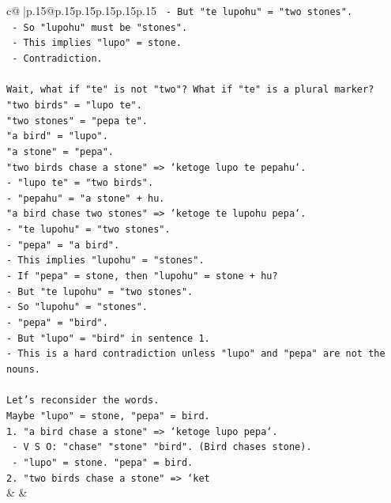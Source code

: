 \documentclass{article}
\begin{document}
{\begin{supertabular}{c@{$\;$}|p{.15\linewidth}@{}p{.15\linewidth}p{.15\linewidth}p{.15\linewidth}p{.15\linewidth}p{.15\linewidth}}
{{{\texttt{   {-} But "te lupohu" = "two stones".} \\
\texttt{   {-} So "lupohu" must be "stones".} \\
\texttt{   {-} This implies "lupo" = stone.} \\
\texttt{   {-} Contradiction.} \\
\\ 
\texttt{Wait, what if "te" is not "two"? What if "te" is a plural marker?} \\
\texttt{"two birds" = "lupo te".} \\
\texttt{"two stones" = "pepa te".} \\
\texttt{"a bird" = "lupo".} \\
\texttt{"a stone" = "pepa".} \\
\texttt{"two birds chase a stone" => `ketoge lupo te pepahu`.} \\
\texttt{{-} "lupo te" = "two birds".} \\
\texttt{{-} "pepahu" = "a stone" + hu.} \\
\texttt{"a bird chase two stones" => `ketoge te lupohu pepa`.} \\
\texttt{{-} "te lupohu" = "two stones".} \\
\texttt{{-} "pepa" = "a bird".} \\
\texttt{{-} This implies "lupohu" = "stones".} \\
\texttt{{-} If "pepa" = stone, then "lupohu" = stone + hu?} \\
\texttt{{-} But "te lupohu" = "two stones".} \\
\texttt{{-} So "lupohu" = "stones".} \\
\texttt{{-} "pepa" = "bird".} \\
\texttt{{-} But "lupo" = "bird" in sentence 1.} \\
\texttt{{-} This is a hard contradiction unless "lupo" and "pepa" are not the nouns.} \\
\\ 
\texttt{Let's reconsider the words.} \\
\texttt{Maybe "lupo" = stone, "pepa" = bird.} \\
\texttt{1. "a bird chase a stone" => `ketoge lupo pepa`.} \\
\texttt{   {-} V S O: "chase" "stone" "bird". (Bird chases stone).} \\
\texttt{   {-} "lupo" = stone. "pepa" = bird.} \\
\texttt{2. "two birds chase a stone" => `ket} \\
            }
        }
    }
    & & \\ \\


\end{supertabular}}
\end{document}
